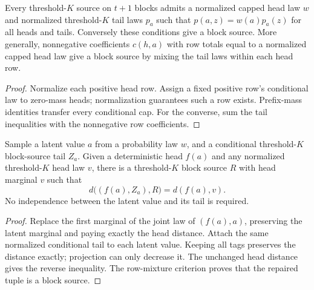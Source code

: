 \begin{theorem}
  \label{thm:lowerbounds-algebraic-block-conditioning}
  \leanok
  Every threshold-$K$ source on $t+1$ blocks admits a normalized capped
  head law $w$ and normalized threshold-$K$ tail laws $p_a$ such that
  $p(a,z)=w(a)p_a(z)$ for all heads and tails. Conversely these conditions
  give a block source. More generally, nonnegative coefficients $c(h,a)$
  with row totals equal to a normalized capped head law give a block
  source by mixing the tail laws within each head row.
\end{theorem}
\begin{proof}
  \leanok
  Normalize each positive head row. Assign a fixed positive row's
  conditional law to zero-mass heads; normalization guarantees such a row
  exists. Prefix-mass identities transfer every conditional cap. For the
  converse, sum the tail inequalities with the nonnegative row coefficients.
\end{proof}

\begin{theorem}
  \label{thm:lowerbounds-algebraic-block-tail-repair}
  \leanok
  Sample a latent value $a$ from a probability law $w$, and a conditional
  threshold-$K$ block-source tail $Z_a$. Given a deterministic head $f(a)$
  and any normalized threshold-$K$ head law $v$, there is a threshold-$K$
  block source $R$ with head marginal $v$ such that
  \[
    d\bigl((f(a),Z_a),R\bigr)=d(f(a),v).
  \]
  No independence between the latent value and its tail is required.
\end{theorem}
\begin{proof}
  \leanok
  Replace the first marginal of the joint law of $(f(a),a)$, preserving
  the latent marginal and paying exactly the head distance. Attach the
  same normalized conditional tail to each latent value. Keeping all tags
  preserves the distance exactly; projection can only decrease it.
  The unchanged head distance gives the reverse inequality. The row-mixture
  criterion proves that the repaired tuple is a block source.
\end{proof}

